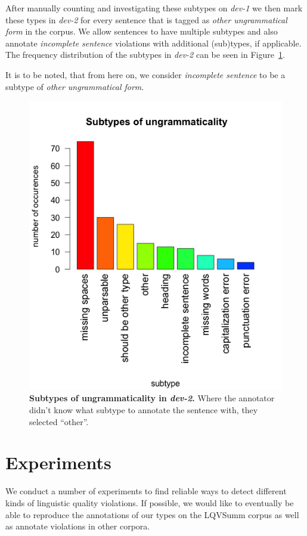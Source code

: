 \documentclass[a4paper,10pt]{scrartcl}
\theoremstyle{style}
\begin{document}
After manually counting and investigating these subtypes on \textit{dev-1} we then mark these types in \textit{dev-2} for every sentence that is tagged as \textit{other ungrammatical form} in the corpus. We allow sentences to have multiple subtypes and also annotate \textit{incomplete sentence} violations with additional (sub)types, if applicable. The frequency distribution of the subtypes in \textit{dev-2} can be seen in Figure~\ref{subtypes}.

It is to be noted, that from here on, we consider \textit{incomplete sentence} to be a subtype of \textit{other ungrammatical form}.

\begin{figure}
\begin{center}
\includegraphics[scale=0.6]{subtypes_dev2.png}
\end{center}
\caption{\textbf{Subtypes of ungrammaticality in \textit{dev-2}.} Where the annotator didn't know what subtype to annotate the sentence with, they selected ``other''.}
\label{subtypes}
\end{figure}

\section{Experiments}
\label{experiments}
We conduct a number of experiments to find reliable ways to detect different kinds of linguistic quality violations. If possible, we would like to eventually be able to reproduce the annotations of our types on the LQVSumm corpus as well as annotate violations in other corpora.
\end{document}
